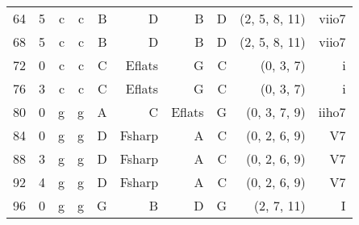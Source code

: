 \begin{tabular}{r|rrrrrrrrr}
64       & 5   & c    & c    & B            & D            & B           & D            & (2, 5, 8, 11) & viio7 \\
68       & 5   & c    & c    & B            & D            & B           & D            & (2, 5, 8, 11) & viio7 \\ \hline
72       & 0   & c    & c    & C            & E\glspl{flat}  & G           & C            & (0, 3, 7)     & i     \\
76       & 3   & c    & c    & C            & E\glspl{flat}  & G           & C            & (0, 3, 7)     & i     \\
80       & 0   & g    & g    & A            & C            & E\glspl{flat} & G            & (0, 3, 7, 9)  & iiho7 \\
84       & 0   & g    & g    & D            & F\gls{sharp} & A           & C            & (0, 2, 6, 9)  & V7    \\
88       & 3   & g    & g    & D            & F\gls{sharp} & A           & C            & (0, 2, 6, 9)  & V7    \\
92       & 4   & g    & g    & D            & F\gls{sharp} & A           & C            & (0, 2, 6, 9)  & V7    \\ \hline
96       & 0   & g    & g    & G            & B            & D           & G            & (2, 7, 11)    & I     \\
\end{tabular}
